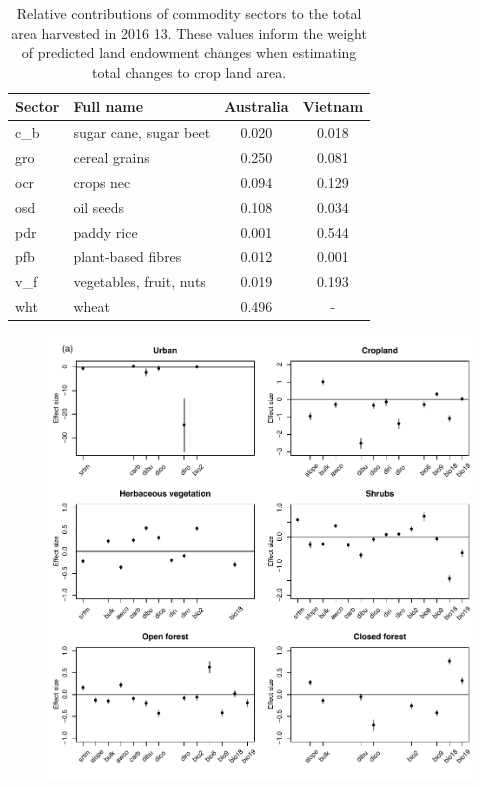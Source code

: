 \documentclass[titlesmallcaps,copyrightpage]{uomthesis}\usepackage[]{graphicx}\usepackage[]{color}
\begin{document}
\begin{table}[htb]
\centering
\caption{Relative contributions of commodity sectors to the total area harvested in 2016 13. These values inform the weight of predicted land endowment changes when estimating total changes to crop land area.}
\label{apx:ch2:tab3}
\begin{tabularx}{0.5\textwidth}{@{}llcc@{}}
\toprule
Sector & Full name & Australia & Vietnam \\ \bottomrule
c\_b & sugar cane, sugar beet & 0.020 & 0.018 \\
gro & cereal grains & 0.250 & 0.081 \\
ocr & crops nec & 0.094 & 0.129 \\
osd & oil seeds & 0.108 & 0.034 \\
pdr & paddy rice & 0.001 & 0.544 \\
pfb & plant-based fibres & 0.012 & 0.001 \\
v\_f & vegetables, fruit, nuts & 0.019 & 0.193 \\
wht & wheat & 0.496 & - \\ \bottomrule
\end{tabularx}
\end{table}

\begin{figure}[htb]
\centering
\includegraphics[width=1\linewidth]{chapters/figures/chapter2/supfig3a.pdf}
\label{apx:ch2:fig3}
\caption{}
\end{figure}
\end{document}

